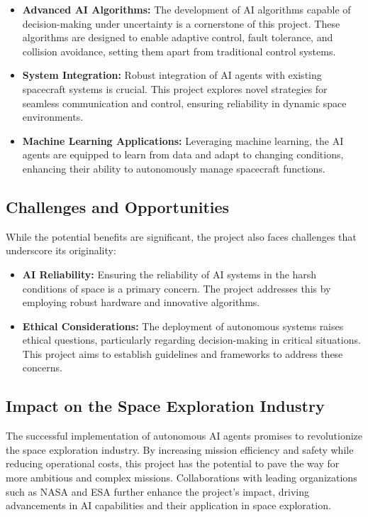 \documentclass[a4paper, 11pt]{article}
\begin{document}
\begin{itemize}
    \item \textbf{Advanced AI Algorithms:} The development of AI algorithms capable of decision-making under uncertainty is a cornerstone of this project. These algorithms are designed to enable adaptive control, fault tolerance, and collision avoidance, setting them apart from traditional control systems.
    \item \textbf{System Integration:} Robust integration of AI agents with existing spacecraft systems is crucial. This project explores novel strategies for seamless communication and control, ensuring reliability in dynamic space environments.
    \item \textbf{Machine Learning Applications:} Leveraging machine learning, the AI agents are equipped to learn from data and adapt to changing conditions, enhancing their ability to autonomously manage spacecraft functions.
\end{itemize}

\subsection{Challenges and Opportunities}

While the potential benefits are significant, the project also faces challenges that underscore its originality:

\begin{itemize}
    \item \textbf{AI Reliability:} Ensuring the reliability of AI systems in the harsh conditions of space is a primary concern. The project addresses this by employing robust hardware and innovative algorithms.
    \item \textbf{Ethical Considerations:} The deployment of autonomous systems raises ethical questions, particularly regarding decision-making in critical situations. This project aims to establish guidelines and frameworks to address these concerns.
\end{itemize}

\subsection{Impact on the Space Exploration Industry}

The successful implementation of autonomous AI agents promises to revolutionize the space exploration industry. By increasing mission efficiency and safety while reducing operational costs, this project has the potential to pave the way for more ambitious and complex missions. Collaborations with leading organizations such as NASA and ESA further enhance the project's impact, driving advancements in AI capabilities and their application in space exploration.
\end{document}
